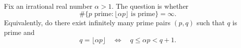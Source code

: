 \\
Fix an irrational real number $\alpha>1$.
The question is whether
\[
\#\{p\text{ prime}: \lfloor \alpha p\rfloor\text{ is prime}\}=\infty.
\]
Equivalently, do there exist infinitely many prime pairs $(p,q)$ such that $q$ is prime and
\[
 q=\lfloor \alpha p\rfloor \quad\Longleftrightarrow\quad q\le \alpha p<q+1.
\]
